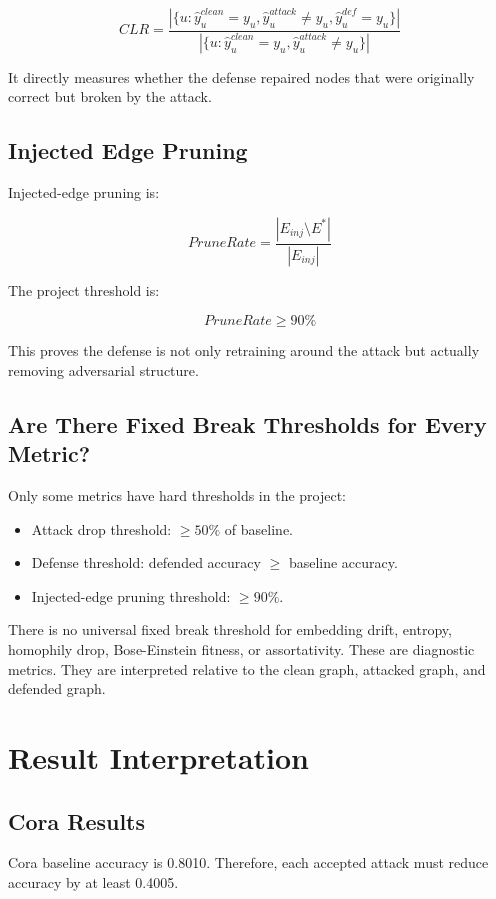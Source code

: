 \documentclass[12pt,a4paper]{article}
\begin{document}
$$
CLR=\frac{|\{u:\hat{y}^{clean}_u=y_u,\hat{y}^{attack}_u\neq y_u,\hat{y}^{def}_u=y_u\}|}{|\{u:\hat{y}^{clean}_u=y_u,\hat{y}^{attack}_u\neq y_u\}|}
$$

It directly measures whether the defense repaired nodes that were originally correct but broken by the attack.

\subsection{Injected Edge Pruning}
Injected-edge pruning is:

$$
PruneRate=\frac{|E_{inj}\setminus E^*|}{|E_{inj}|}
$$

The project threshold is:

$$
PruneRate\geq 90\%
$$

This proves the defense is not only retraining around the attack but actually removing adversarial structure.

\subsection{Are There Fixed Break Thresholds for Every Metric?}
Only some metrics have hard thresholds in the project:

\begin{itemize}
    \item Attack drop threshold: $\geq50\%$ of baseline.
    \item Defense threshold: defended accuracy $\geq$ baseline accuracy.
    \item Injected-edge pruning threshold: $\geq90\%$.
\end{itemize}

There is no universal fixed break threshold for embedding drift, entropy, homophily drop, Bose-Einstein fitness, or assortativity. These are diagnostic metrics. They are interpreted relative to the clean graph, attacked graph, and defended graph.

\section{Result Interpretation}

\subsection{Cora Results}
Cora baseline accuracy is 0.8010. Therefore, each accepted attack must reduce accuracy by at least 0.4005.
\end{document}
